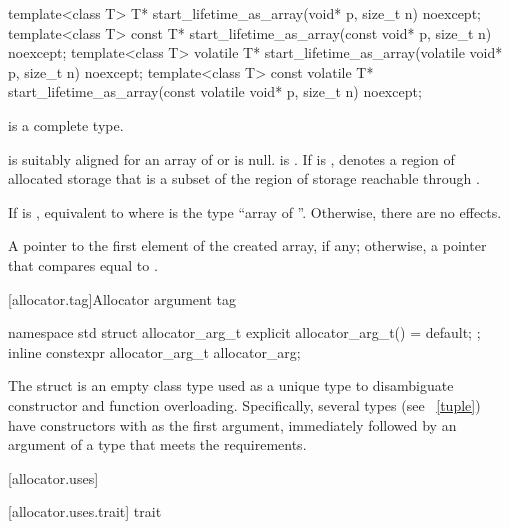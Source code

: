 %
\begin{itemdecl}
template<class T>
  T* start_lifetime_as_array(void* p, size_t n) noexcept;
template<class T>
  const T* start_lifetime_as_array(const void* p, size_t n) noexcept;
template<class T>
  volatile T* start_lifetime_as_array(volatile void* p, size_t n) noexcept;
template<class T>
  const volatile T* start_lifetime_as_array(const volatile void* p, size_t n) noexcept;
\end{itemdecl}

\begin{itemdescr}
\pnum
\mandates
{} is a complete type.

\pnum
\expects
{} is suitably aligned for an array of  or is null.
 is .
If  is ,
 denotes
a region of allocated storage that is
a subset of the region of storage
reachable through .

\pnum
\effects
If  is ,
equivalent to
where  is the type ``array of  ''.
Otherwise, there are no effects.

\pnum
\returns
A pointer to the first element of the created array,
if any;
otherwise,
a pointer that compares equal to .
\end{itemdescr}

[allocator.tag]{Allocator argument tag}

%
%
\begin{itemdecl}
namespace std {
  struct allocator_arg_t { explicit allocator_arg_t() = default; };
  inline constexpr allocator_arg_t allocator_arg{};
}
\end{itemdecl}

\pnum
The  struct is an empty class type used as a unique type to
disambiguate constructor and function overloading. Specifically, several types (see
~\ref{tuple}) have constructors with  as the first
argument, immediately followed by an argument of a type that meets the
 requirements.

[allocator.uses]{}

[allocator.uses.trait]{ trait}

